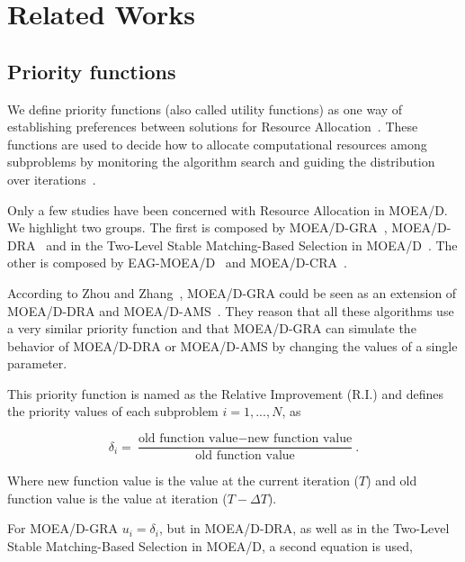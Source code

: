 \section{Related Works}

\subsection{Priority functions}

We define priority functions (also called utility functions) as one way of establishing preferences between solutions for Resource Allocation~\cite{chankong1983multiobjective}. These functions are used to decide how to allocate computational resources among subproblems by monitoring the algorithm search and guiding the distribution over iterations~\cite{cai2015external}. 

Only a few studies have been concerned with Resource Allocation in MOEA/D. We highlight two groups. The first is composed by MOEA/D-GRA~\cite{zhou2016all}, MOEA/D-DRA~\cite{zhang2009performance} and in the Two-Level Stable Matching-Based Selection in MOEA/D~\cite{nasir2011improved}. The other is composed by EAG-MOEA/D~\cite{cai2015external} and MOEA/D-CRA~\cite{kang2018collaborative}.

According to Zhou and Zhang~\cite{zhou2016all}, MOEA/D-GRA could be seen as an extension of MOEA/D-DRA and MOEA/D-AMS~\cite{chiang2011moea}. They reason that all these algorithms use a very similar priority function and that MOEA/D-GRA can simulate the behavior of MOEA/D-DRA or MOEA/D-AMS by changing the values of a single parameter. 

This priority function is named as the Relative Improvement (R.I.) and defines the priority values of each subproblem $i=1,...,N$, as

\begin{equation}\label{priority}
\delta_i = \dfrac{\text{old function value}-\text{new function value}}{\text{old function value}}.
\end{equation}

Where new function value is the value at the current iteration ($T$) and old function value is the value at iteration ($T - \Delta T$).

For MOEA/D-GRA $u_i = \delta_i$, but in MOEA/D-DRA, as well as in the Two-Level Stable Matching-Based Selection in MOEA/D, a second equation is used,

